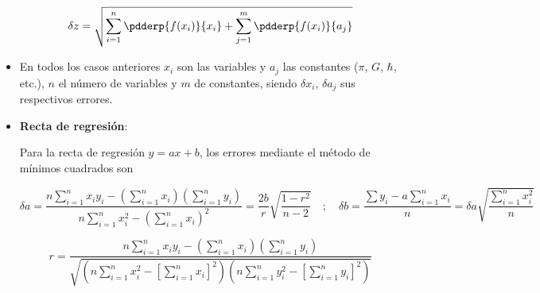 \begin{itemize}
\begin{equation}
\delta z = \sqrt{ \sum_{i=1}^n \pdderp{f(x_i)}{x_i} + \sum_{j=1}^m \pdderp{f(x_i)}{a_j} } 
\label{eq:q-err}
\end{equation}

\item En todos los casos anteriores $x_i$ son las variables y $a_j$ las constantes ($\pi$, $G$, $\hbar$, etc.), $n$ el número de variables y $m$ de constantes,
siendo $\delta x_i$, $\delta a_j$ sus respectivos errores.

\item \textbf{Recta de regresión}:

Para la recta de regresión $y=ax+b$, los errores mediante el método de mínimos cuadrados son

\begin{equation}
  \delta a = \frac{n\sum_{i=1}^n x_i y_i - \left( \sum_{i=1}^n x_i\right)\left( \sum_{i=1}^n y_i\right) }{n \sum_{i=1}^n x^2_i -\left( \sum_{i=1}^n
  x_i\right)^2} = \frac{2b}{r}\sqrt{\frac{1-r^2}{n-2}} \quad ; \quad \delta b = \frac{\sum y_i - a\sum_{i=1}^n
  x_i}{n}= \delta a \sqrt{\frac{\sum_{i=1}^n x^2_i}{n}}  
  \label{eq:ab-err}
\end{equation}

\begin{equation}
  r = \frac{n\sum_{i=1}^n x_i y_i -\left( \sum_{i=1}^n x_i \right) \left( \sum_{i=1}^n y_i \right)}{\sqrt{ \left( n\sum_{i=1}^n x^2_i - \left[ \sum_{i=1}^n
  x_i\right]^2\right)\left( n\sum_{i=1}^n y^2_i - \left[ \sum_{i=1}^n
  y_i\right ]^2 \right)}}
  \label{eq:r-coef}
\end{equation}

\end{itemize}




